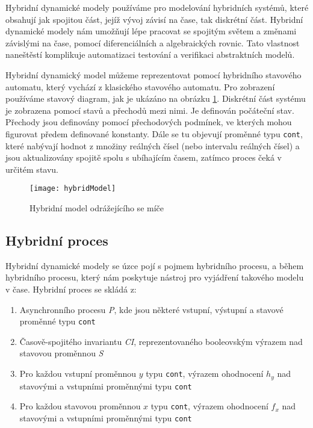 \documentclass[conference,a4paper]{IEEEtran-CZ}
\begin{document}
Hybridní dynamické modely používáme pro modelování hybridních systémů, které obsahují 
jak spojitou část, jejíž vývoj závisí na čase, tak diskrétní část. Hybridní dynamické modely 
nám umožňují lépe pracovat se spojitým světem a změnami závislými na čase, pomocí 
diferenciálních a algebraických rovnic. Tato vlastnost naneštěstí komplikuje automatizaci testování 
a verifikaci abstraktních modelů.

Hybridní dynamický model můžeme reprezentovat pomocí hybridního stavového 
automatu, který vychází z klasického stavového automatu. Pro zobrazení používáme 
stavový diagram, jak je ukázáno na obrázku \ref{fig:bouncingBall}. Diskrétní část systému 
je zobrazena pomocí stavů a přechodů mezi nimi. Je definován počáteční stav. 
Přechody jsou definovány pomocí přechodových podmínek, ve kterých mohou figurovat 
předem definované konstanty. Dále se tu objevují proměnné typu \texttt{cont}, které 
nabývají hodnot z množiny reálných čísel (nebo intervalu reálných čísel) 
a jsou aktualizovány spojitě spolu s ubíhajícím časem, zatímco proces čeká v určitém stavu.

\begin{figure}
\centering
\texttt{[image: hybridModel]}
\caption{Hybridní model odrážejícího se míče}
\label{fig:bouncingBall}
\end{figure}

\subsection{Hybridní proces}

Hybridní dynamické modely se úzce pojí s pojmem hybridního procesu, a během hybridního procesu, 
který nám poskytuje nástroj pro vyjádření takového modelu v čase. Hybridní proces se skládá z:\cite{Rajeev:2015}

\begin{enumerate}
  \item Asynchronního procesu \textit{P}, kde jsou některé vstupní, výstupní a stavové proměnné typu \texttt{cont}
  \item Časově-spojitého invariantu \textit{CI}, reprezentovaného booleovským výrazem nad stavovou proměnnou \textit{S}
  \item Pro každou vstupní proměnnou $y$ typu \texttt{cont}, výrazem ohodnocení $h_y$ nad stavovými a vstupními proměnnými typu \texttt{cont}
  \item Pro každou stavovou proměnnou $x$ typu \texttt{cont}, výrazem ohodnocení $f_x$ nad stavovými a vstupními proměnnými typu \texttt{cont}
\end{enumerate}
\end{document}
